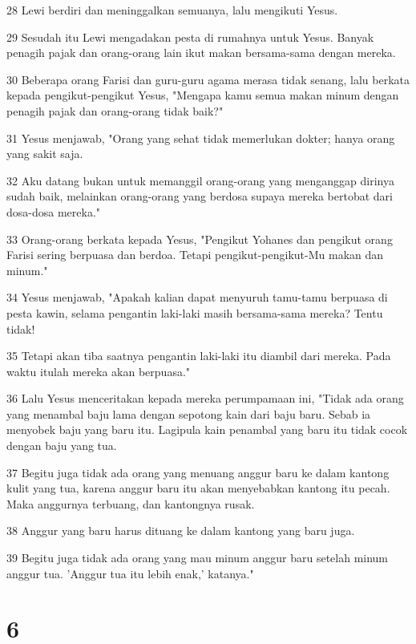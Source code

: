 \par 28 Lewi berdiri dan meninggalkan semuanya, lalu mengikuti Yesus.
\par 29 Sesudah itu Lewi mengadakan pesta di rumahnya untuk Yesus. Banyak penagih pajak dan orang-orang lain ikut makan bersama-sama dengan mereka.
\par 30 Beberapa orang Farisi dan guru-guru agama merasa tidak senang, lalu berkata kepada pengikut-pengikut Yesus, "Mengapa kamu semua makan minum dengan penagih pajak dan orang-orang tidak baik?"
\par 31 Yesus menjawab, "Orang yang sehat tidak memerlukan dokter; hanya orang yang sakit saja.
\par 32 Aku datang bukan untuk memanggil orang-orang yang menganggap dirinya sudah baik, melainkan orang-orang yang berdosa supaya mereka bertobat dari dosa-dosa mereka."
\par 33 Orang-orang berkata kepada Yesus, "Pengikut Yohanes dan pengikut orang Farisi sering berpuasa dan berdoa. Tetapi pengikut-pengikut-Mu makan dan minum."
\par 34 Yesus menjawab, "Apakah kalian dapat menyuruh tamu-tamu berpuasa di pesta kawin, selama pengantin laki-laki masih bersama-sama mereka? Tentu tidak!
\par 35 Tetapi akan tiba saatnya pengantin laki-laki itu diambil dari mereka. Pada waktu itulah mereka akan berpuasa."
\par 36 Lalu Yesus menceritakan kepada mereka perumpamaan ini, "Tidak ada orang yang menambal baju lama dengan sepotong kain dari baju baru. Sebab ia menyobek baju yang baru itu. Lagipula kain penambal yang baru itu tidak cocok dengan baju yang tua.
\par 37 Begitu juga tidak ada orang yang menuang anggur baru ke dalam kantong kulit yang tua, karena anggur baru itu akan menyebabkan kantong itu pecah. Maka anggurnya terbuang, dan kantongnya rusak.
\par 38 Anggur yang baru harus dituang ke dalam kantong yang baru juga.
\par 39 Begitu juga tidak ada orang yang mau minum anggur baru setelah minum anggur tua. 'Anggur tua itu lebih enak,' katanya."

\chapter{6}

